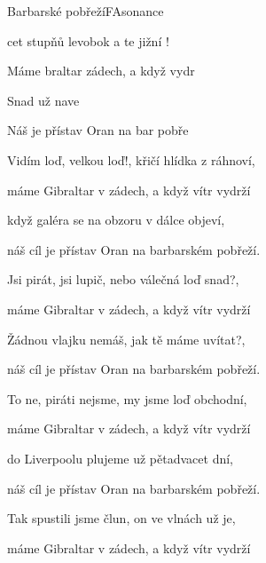 \setcounter{page}{7}
\begin{song}{Barbarské pobřeží}{F}{Asonance}

\begin{SBVerse}

cet stupňů levobok a te jižní !

Máme braltar  zádech, a když  vydr

Snad   už  nave

Náš  je přístav Oran na bar pobře

\end{SBVerse}

\begin{SBVerse}

Vidím loď, velkou loď!, křičí hlídka z ráhnoví,

máme Gibraltar v zádech, a když vítr vydrží

když galéra se na obzoru v dálce objeví,

náš cíl je přístav Oran na barbarském pobřeží.

\end{SBVerse}

\begin{SBVerse}

Jsi pirát, jsi lupič, nebo válečná loď snad?,

máme Gibraltar v zádech, a když vítr vydrží

Žádnou vlajku nemáš, jak tě máme uvítat?,

náš cíl je přístav Oran na barbarském pobřeží.

\end{SBVerse}

\begin{SBVerse}

To ne, piráti nejsme, my jsme loď obchodní,

máme Gibraltar v zádech, a když vítr vydrží

do Liverpoolu plujeme už pětadvacet dní,

náš cíl je přístav Oran na barbarském pobřeží.

\end{SBVerse}

\begin{SBVerse}

Tak spustili jsme člun, on ve vlnách už je,

máme Gibraltar v zádech, a když vítr vydrží


\end{SBVerse}
\end{song}
